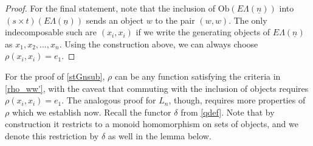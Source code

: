 \documentclass{amsbook} %
\newcommand{\ELn}{E\Lambda(\underline{n})}
\numberwithin{section}{chapter}
\begin{document}
\begin{proof}
For the final statement, note that the inclusion of $\mathrm{Ob}(\ELn)$ into $(s \times t)(\ELn)$ sends an object $w$ to the pair $(w,w)$. The only indecomposable such are $(x_i, x_i)$ if we write the generating objects of $\ELn$ as $x_1, x_2, \ldots, x_n$. Using the construction above, we can always choose $\rho(x_i, x_i) = e_1$.
\end{proof}

For the proof of \cref{stGnsub}, $\rho$ can be any function satisfying the criteria in \cref{rho_ww'}, with the caveat that commuting with the inclusion of objects requires $\rho(x_i, x_i) = e_1$. The analogous proof for $L_n$, though, requires more properties of $\rho$ which we establish now. Recall the functor $\delta$ from \cref{qdef}. Note that by construction it restricts to a monoid homomorphism on sets of objects, and we denote this restriction by $\delta$ as well in the lemma below.
\end{document}
